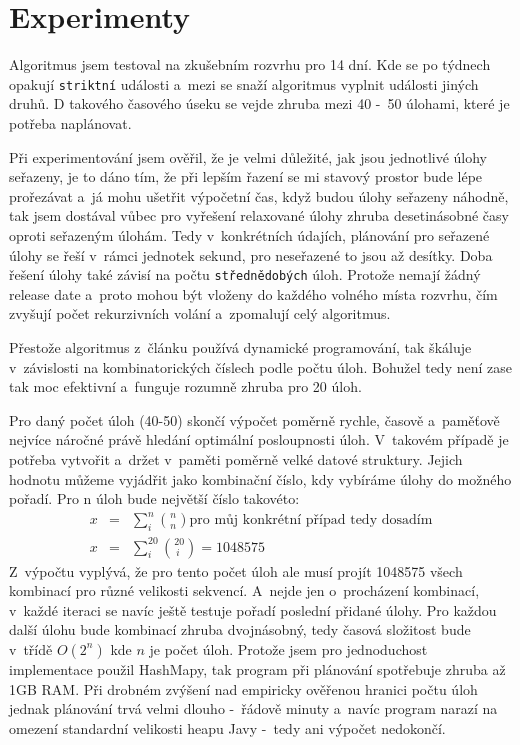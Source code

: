\documentclass[a4paper,11pt]{article}
\begin{document}
\section*{Experimenty}
Algoritmus jsem testoval na zkušebním rozvrhu pro 14 dní. Kde se po týdnech opakují \texttt{striktní} události a~mezi se snaží algoritmus vyplnit události jiných druhů. D takového časového úseku se vejde zhruba mezi 40 -~50 úlohami, které je potřeba naplánovat.

Při experimentování jsem ověřil, že je velmi důležité, jak jsou jednotlivé úlohy seřazeny, je to dáno tím, že při lepším řazení se mi stavový prostor bude lépe prořezávat a~já mohu ušetřit výpočetní čas, když budou úlohy seřazeny náhodně, tak jsem dostával vůbec pro vyřešení relaxované úlohy zhruba desetinásobné časy oproti seřazeným úlohám. Tedy v~konkrétních údajích, plánování pro seřazené úlohy se řeší v~rámci jednotek sekund, pro neseřazené to jsou až desítky. Doba řešení úlohy také závisí na počtu \texttt{střednědobých} úloh. Protože nemají žádný release date a~proto mohou být vloženy do každého volného místa rozvrhu, čím zvyšují počet rekurzivních volání a~zpomalují celý algoritmus.

Přestože algoritmus z~článku \cite{Cheng1990} používá dynamické programování, tak škáluje v~závislosti na kombinatorických číslech podle počtu úloh. Bohužel tedy není zase tak moc efektivní a~funguje rozumně zhruba pro 20 úloh. 

Pro daný počet úloh (40-50) skončí výpočet poměrně rychle, časově a~paměťově nejvíce náročné právě hledání optimální posloupnosti úloh. V~takovém případě	je potřeba vytvořit a~držet v~paměti poměrně velké datové struktury. Jejich hodnotu můžeme vyjádřit jako kombinační číslo, kdy vybíráme úlohy do možného pořadí. Pro n úloh bude největší číslo takovéto:
\begin{eqnarray*}
x &=& \sum_i^n { n \choose n } \text{pro můj konkrétní případ tedy dosadím}\\
x &=& \sum_i^{20} { 20 \choose i~} = 1048575
\end{eqnarray*}
Z~výpočtu vyplývá, že pro tento počet úloh ale musí projít 1048575 všech kombinací pro různé velikosti sekvencí. A~nejde jen o~procházení kombinací, v~každé iteraci se navíc ještě testuje pořadí poslední přidané úlohy. Pro každou další úlohu bude kombinací zhruba dvojnásobný, tedy časová složitost bude v~třídě $O(2^n)$ kde $n$ je počet úloh.
Protože jsem pro jednoduchost implementace použil HashMapy, tak program při plánování spotřebuje zhruba až 1GB RAM. Při drobném zvýšení nad empiricky ověřenou hranici počtu úloh jednak plánování trvá velmi dlouho -~řádově minuty a~navíc program narazí na omezení standardní velikosti heapu Javy -~tedy ani výpočet nedokončí.
\end{document}
